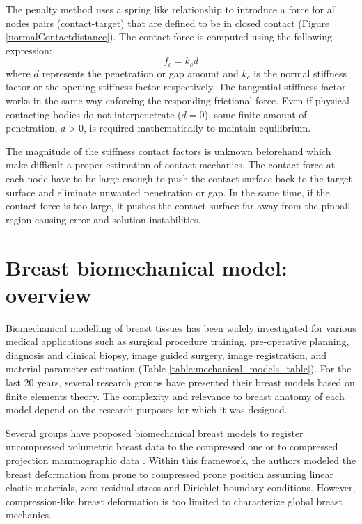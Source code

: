 The penalty method uses a spring like relationship to introduce a force for all nodes pairs (contact-target) that are defined to be in closed contact (Figure \ref{normalContactdistance}). The contact force is computed using the following expression:
\begin{equation}
f_c = k_c d
\end{equation}
where $d$ represents the penetration or gap amount and $k_c$ is the normal stiffness factor or the opening stiffness factor respectively. The tangential stiffness factor works in the same way enforcing the responding frictional force. Even if physical contacting bodies do not interpenetrate ($d = 0$), some finite amount of penetration, $d > 0$, is required mathematically to maintain equilibrium. 
 
 The magnitude of the stiffness contact factors is unknown beforehand which make difficult a proper estimation of contact mechanics. The contact force at each node have to be large enough to push the contact surface back to the target surface and eliminate unwanted penetration or gap. In the same time, if the contact force is too large, it pushes the contact surface far away from the pinball region causing error and solution instabilities.

\section{Breast biomechanical model: overview}

Biomechanical modelling of breast tissues has been widely investigated for various medical applications such as surgical procedure training, pre-operative planning, diagnosis and clinical biopsy, image guided surgery, image registration, and material parameter estimation (Table \ref{table:mechanical_models_table}). For the last 20 years, several research groups have presented their breast models based on finite elements theory.  The complexity and relevance to breast anatomy of each model depend on the research purposes for which it was designed. 

Several groups have proposed biomechanical breast models to register uncompressed volumetric breast data to the compressed one \citep{han_development_2012,ruiter_model_based_2006,sturgeon_finite_element_2016} or to compressed projection mammographic data \citep{kellner_simulation_2007}. Within this framework, the authors modeled the breast deformation from prone to compressed prone position assuming linear elastic materials, zero residual stress and Dirichlet boundary conditions.
However, compression-like breast deformation is too limited to characterize global breast mechanics.

